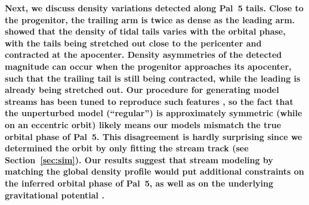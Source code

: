 \documentclass[twocolumn]{aastex62}
\newcommand{\kms}{\ensuremath{\textrm{km}~\textrm{s}^{-1}}}
\newcommand{\changes}[1]{{\textbf{#1}}}
\begin{document}

\changes{Next, we discuss density variations detected along Pal~5 tails.
Close to the progenitor, the trailing arm is twice as dense as the leading arm.
\citet{Kupper:2010} showed that the density of tidal tails varies with the orbital phase, with the tails being stretched out close to the pericenter and contracted at the apocenter.
Density asymmetries of the detected magnitude can occur when the progenitor approaches its apocenter, such that the trailing tail is still being contracted, while the leading is already being stretched out.
Our procedure for generating model streams has been tuned to reproduce such features \citep[cf.][]{Kupper:2012, Fardal:2015}, so the fact that the unperturbed model (``regular'') is approximately symmetric (while on an eccentric orbit) likely means our models mismatch the true orbital phase of Pal~5.
This disagreement is hardly surprising since we determined the orbit by only fitting the stream track (see Section~\ref{sec:sim}).
Our results suggest that stream modeling by matching the global density profile would put additional constraints on the inferred orbital phase of Pal~5, as well as on the underlying gravitational potential \citep[cf.][]{Kupper:2015, Bovy:2016}.
}
\end{document}
